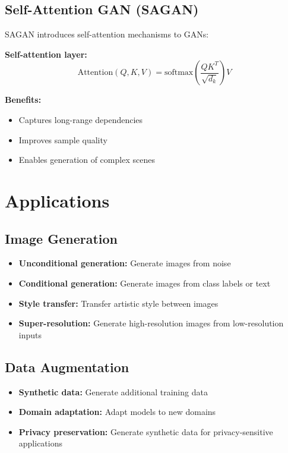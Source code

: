 \subsection{Self-Attention GAN (SAGAN)}

SAGAN introduces self-attention mechanisms to GANs:

\textbf{Self-attention layer:}
\begin{equation}
    \text{Attention}(Q, K, V) = \text{softmax}\left(\frac{QK^T}{\sqrt{d_k}}\right)V
\end{equation}

\textbf{Benefits:}
\begin{itemize}
    \item Captures long-range dependencies
    \item Improves sample quality
    \item Enables generation of complex scenes
\end{itemize}

\section{Applications}

\subsection{Image Generation}

\begin{itemize}
    \item \textbf{Unconditional generation:} Generate images from noise
    \item \textbf{Conditional generation:} Generate images from class labels or text
    \item \textbf{Style transfer:} Transfer artistic style between images
    \item \textbf{Super-resolution:} Generate high-resolution images from low-resolution inputs
\end{itemize}

\subsection{Data Augmentation}

\begin{itemize}
    \item \textbf{Synthetic data:} Generate additional training data
    \item \textbf{Domain adaptation:} Adapt models to new domains
    \item \textbf{Privacy preservation:} Generate synthetic data for privacy-sensitive applications
\end{itemize}

